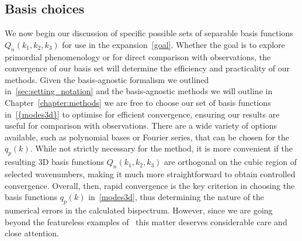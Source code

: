 \subsection{Basis choices}\label{sec:large_non_physical}
We now begin our discussion of specific possible sets of separable
basis functions $Q_n(k_1,k_2,k_3)$
for use in the expansion~\eqref{goal}.
Whether the goal is to explore primordial phenomenology or for direct comparison with observations,
the convergence of our basis set will determine the efficiency and practicality
of our methods.
Given the basis-agnostic formalism we outlined in~\ref{sec:setting_notation} and
the basis-agnostic methods we will outline in Chapter~\ref{chapter:methods}
we are free to choose our set of basis functions in~\eqref{{modes3d}}
to optimise for efficient convergence,
ensuring our results are useful for comparison with observations. 
There are a wide variety of options available, such as polynomial bases
or Fourier series, that can be chosen for the $q_p(k)$.
While not strictly necessary for the method, it is more convenient if 
the resulting 3D basis functions $Q_n(k_1,k_2,k_3)$
are orthogonal on the cubic region of selected wavenumbers, making it much more straightforward to obtain controlled convergence. Overall, then, rapid convergence is the key criterion in choosing the basis functions $q_p(k)$ in~\eqref{modes3d}, thus determining the nature of the numerical errors in the calculated bispectrum.
However, since we are going beyond the featureless examples of~\cite{Funakoshi}
this matter deserves considerable care and close attention.
